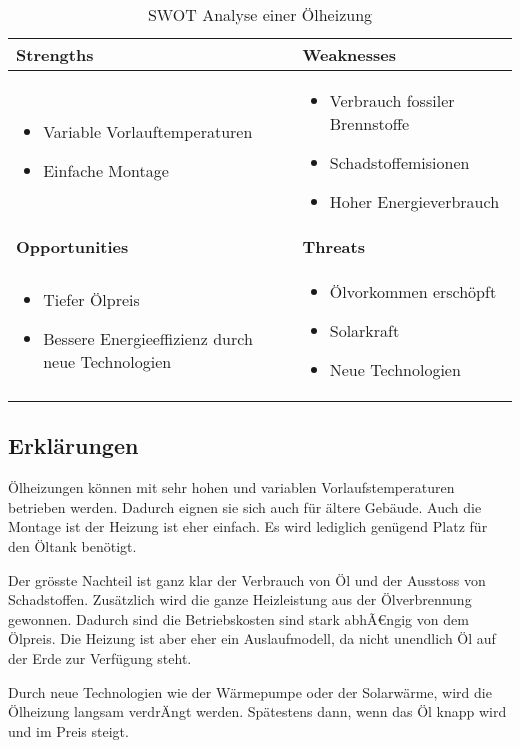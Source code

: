 \begin{table}[h!]
\begin{tabular}[c]{|p{}|p{}|}
  \hline
  \textbf{Strengths} &
  \textbf{Weaknesses} \\ \hline
  
  \begin{itemize}
    \item Variable Vorlauftemperaturen
    \item Einfache Montage
  \end{itemize}
  &
  
  \begin{itemize}
    \item Verbrauch fossiler Brennstoffe
    \item Schadstoffemisionen
    \item Hoher Energieverbrauch
  \end{itemize}
  \\ \hline
  
  \textbf{Opportunities} &
  \textbf{Threats} \\ \hline
  
  \begin{itemize}
    \item Tiefer Ölpreis
    \item Bessere Energieeffizienz durch neue Technologien
  \end{itemize}
  &
  
  \begin{itemize}
  	\item Ölvorkommen erschöpft
    \item Solarkraft
    \item Neue Technologien
  \end{itemize}  
  \\ \hline
\end{tabular}
\label{swot:warmepumpe}
\caption{SWOT Analyse einer Ölheizung}
\end{table}

\subsection{Erklärungen}

Ölheizungen können mit sehr hohen und variablen Vorlaufstemperaturen betrieben werden. Dadurch eignen sie sich auch für ältere Gebäude. 
Auch die Montage ist der Heizung ist eher einfach. Es wird lediglich genügend Platz für den Öltank benötigt.

Der grösste Nachteil ist ganz klar der Verbrauch von Öl und der Ausstoss von Schadstoffen. Zusätzlich wird die ganze Heizleistung aus der Ölverbrennung gewonnen.
Dadurch sind die Betriebskosten sind stark abhÃ€ngig von dem Ölpreis.
Die Heizung ist aber eher ein Auslaufmodell, da nicht unendlich Öl auf der Erde zur Verfügung steht.

Durch neue Technologien wie der Wärmepumpe oder der Solarwärme, wird die Ölheizung langsam verdrÄngt werden. Spätestens dann, wenn das Öl knapp wird und im Preis steigt.


